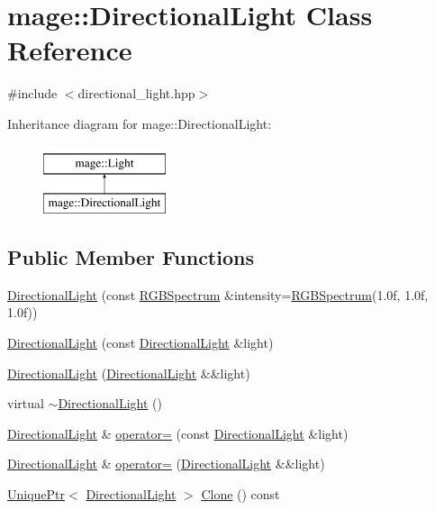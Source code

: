 \hypertarget{classmage_1_1_directional_light}{}\section{mage\+:\+:Directional\+Light Class Reference}
\label{classmage_1_1_directional_light}


{\ttfamily \#include $<$directional\+\_\+light.\+hpp$>$}

Inheritance diagram for mage\+:\+:Directional\+Light\+:\begin{figure}[H]
\begin{center}
\leavevmode
\includegraphics[height=2.000000cm]{classmage_1_1_directional_light}
\end{center}
\end{figure}
\subsection*{Public Member Functions}
\begin{DoxyCompactItemize}
\item 
\hyperlink{classmage_1_1_directional_light_a67df04219f61a8350045e5743b1de284}{Directional\+Light} (const \hyperlink{structmage_1_1_r_g_b_spectrum}{R\+G\+B\+Spectrum} \&intensity=\hyperlink{structmage_1_1_r_g_b_spectrum}{R\+G\+B\+Spectrum}(1.\+0f, 1.\+0f, 1.\+0f))
\item 
\hyperlink{classmage_1_1_directional_light_a777b1b8e00a51ba84f6af774a7b519ea}{Directional\+Light} (const \hyperlink{classmage_1_1_directional_light}{Directional\+Light} \&light)
\item 
\hyperlink{classmage_1_1_directional_light_a9563b260b550057e951500c40ecbe2d3}{Directional\+Light} (\hyperlink{classmage_1_1_directional_light}{Directional\+Light} \&\&light)
\item 
virtual \hyperlink{classmage_1_1_directional_light_a967d33c11a1477c01ce4c9720337caeb}{$\sim$\+Directional\+Light} ()
\item 
\hyperlink{classmage_1_1_directional_light}{Directional\+Light} \& \hyperlink{classmage_1_1_directional_light_a371d3c13d6e59c8d105da058b460874d}{operator=} (const \hyperlink{classmage_1_1_directional_light}{Directional\+Light} \&light)
\item 
\hyperlink{classmage_1_1_directional_light}{Directional\+Light} \& \hyperlink{classmage_1_1_directional_light_a508b595bf6aa5fc9db53e0a854fda41d}{operator=} (\hyperlink{classmage_1_1_directional_light}{Directional\+Light} \&\&light)
\item 
\hyperlink{namespacemage_a8c307fbcc33bce9b7f2aa4c26c3b95cf}{Unique\+Ptr}$<$ \hyperlink{classmage_1_1_directional_light}{Directional\+Light} $>$ \hyperlink{classmage_1_1_directional_light_a779c49e066215cff9f80ed40048dfc62}{Clone} () const
\end{DoxyCompactItemize}
